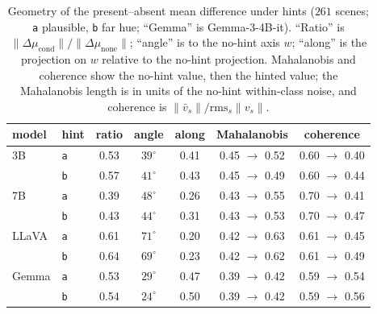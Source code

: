 \documentclass[10pt]{article}
\newcommand{\wdir}{w}
\begin{document}
\begin{table}[t]
\centering
\small
\setlength{\tabcolsep}{3.5pt}
\caption{Geometry of the present--absent mean difference under hints ($261$ scenes; \texttt{a} plausible, \texttt{b} far hue; ``Gemma'' is Gemma-3-4B-it). ``Ratio'' is $\|\Delta\mu_{\text{cond}}\|/\|\Delta\mu_{\text{none}}\|$; ``angle'' is to the no-hint axis $\wdir$; ``along'' is the projection on $\wdir$ relative to the no-hint projection. Mahalanobis and coherence show the no-hint value, then the hinted value; the Mahalanobis length is in units of the no-hint within-class noise, and coherence is $\|\bar v_s\|/\mathrm{rms}_s\|v_s\|$.}
\label{tab:geometry}
\begin{tabular}{llccccc}
\toprule
model & hint & ratio & angle & along & Mahalanobis & coherence \\
\midrule
3B & \texttt{a} & 0.53 & $39^\circ$ & 0.41 & 0.45 $\to$ 0.52 & 0.60 $\to$ 0.40 \\
   & \texttt{b} & 0.57 & $41^\circ$ & 0.43 & 0.45 $\to$ 0.49 & 0.60 $\to$ 0.44 \\
7B & \texttt{a} & 0.39 & $48^\circ$ & 0.26 & 0.43 $\to$ 0.55 & 0.70 $\to$ 0.41 \\
   & \texttt{b} & 0.43 & $44^\circ$ & 0.31 & 0.43 $\to$ 0.53 & 0.70 $\to$ 0.47 \\
LLaVA & \texttt{a} & 0.61 & $71^\circ$ & 0.20 & 0.42 $\to$ 0.63 & 0.61 $\to$ 0.45 \\
      & \texttt{b} & 0.64 & $69^\circ$ & 0.23 & 0.42 $\to$ 0.62 & 0.61 $\to$ 0.49 \\
Gemma & \texttt{a} & 0.53 & $29^\circ$ & 0.47 & 0.39 $\to$ 0.42 & 0.59 $\to$ 0.54 \\
      & \texttt{b} & 0.54 & $24^\circ$ & 0.50 & 0.39 $\to$ 0.42 & 0.59 $\to$ 0.56 \\
\bottomrule
\end{tabular}
\end{table}
\end{document}
